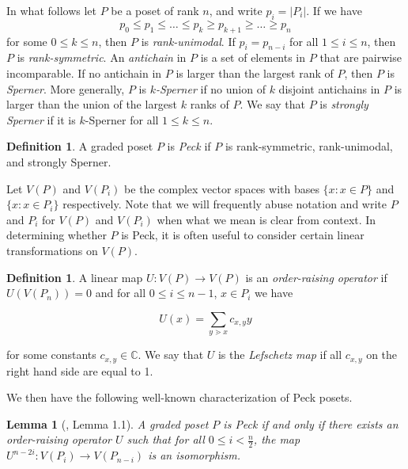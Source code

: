 \documentclass[smallextended, envcountsame, numbook]{svjour3}
\theoremstyle{plain}
\newtheorem{lem}[thm]{Lemma}
\theoremstyle{definition}
\newtheorem{defn}[thm]{Definition}
\theoremstyle{remark}
\numberwithin{equation}{section}
\begin{document}
In what follows let $P$ be a poset of rank $n$, and write $p_i = |P_i|$.  If we have
$$p_0\le p_1\le \ldots \le p_k \ge p_{k+1} \ge\ldots \ge p_n$$
for some $0\le k\le n$, then $P$ is \textit{rank-unimodal}. If $p_i = p_{n-i}$ for all $1\le i\le n$, then $P$ is \textit{rank-symmetric}.  An \textit{antichain} in $P$ is a set of elements in $P$ that are pairwise incomparable.  If no antichain in $P$ is larger than the largest rank of $P$, then $P$ is \textit{Sperner}.  More generally, $P$ is \textit{$k$-Sperner} if no union of $k$ disjoint antichains in $P$ is larger than the union of the largest $k$ ranks of $P$. We say that $P$ is \textit{strongly Sperner} if it is $k$-Sperner for all $1\le k\le n$.

\begin{defn}
	\label{defn:peck}
A graded poset $P$ is \textit{Peck} if $P$ is rank-symmetric, rank-unimodal, and strongly Sperner.
\end{defn}


Let $V(P)$ and $V(P_i)$ be the complex vector spaces with bases $\{x :x\in P\}$ and $\{x :x\in P_i\}$ respectively.  Note that we will frequently abuse notation and write $P$ and $P_i$ for $V(P)$ and $V(P_i)$  when what we mean is clear from context.  In determining whether $P$ is Peck, it is often useful to consider certain linear transformations on $V(P)$.

\begin{defn}
\label{defn:lefschetz}
A linear map $U\colon V(P)\rightarrow V(P)$ is an \textit{order-raising operator} if $U(V(P_n)) = 0$ and for all $0\le i\le n-1$, $x\in P_i$ we have

$$U(x) = \sum_{y\gtrdot x} c_{x,y}y$$

\noindent for some constants $c_{x,y}\in \mathbb{C}$.  We say that $U$ is the \textit{Lefschetz map} if all $c_{x,y}$ on the right hand side are equal to 1.
\end{defn}

\noindent We then have the following well-known characterization of Peck posets.

\begin{lem}[\cite{weyl_groups_stanley}, Lemma 1.1]\label{lem:Peck_poset_characterization}
A graded poset $P$ is Peck if and only if there exists an order-raising operator $U$ such that for all $0\le i < \frac{n}{2}$, the map $U^{n-2i}\colon V(P_i)\rightarrow V(P_{n-i})$ is an isomorphism.
\end{lem}
\end{document}
